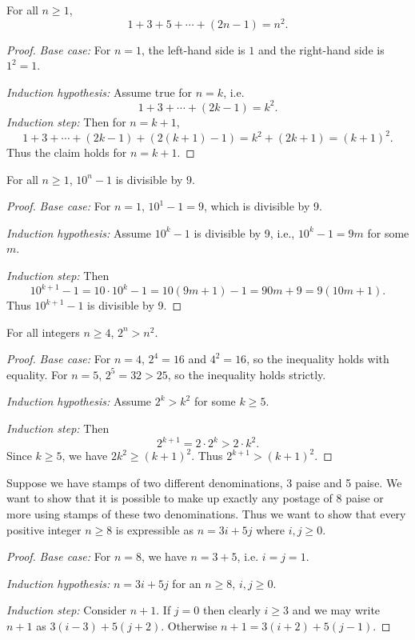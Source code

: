 \begin{theorem}
For all $n \geq 1$,
\[
1+3+5+\cdots+(2n-1) = n^2.
\]
\end{theorem}
\begin{proof}

\noindent
\emph{Base case:} For $n=1$, the left-hand side is $1$ and the right-hand side 
is $1^2=1$.

\noindent
\emph{Induction hypothesis:} Assume true for $n=k$, i.e.
\[
1+3+\cdots+(2k-1) = k^2.
\]
\emph{Induction step:} Then for $n=k+1$,
\[
1+3+\cdots+(2k-1) + (2(k+1)-1) = k^2 + (2k+1) = (k+1)^2.
\]
Thus the claim holds for $n=k+1$.
\end{proof}

\begin{theorem}
For all $n \geq 1$, $10^n - 1$ is divisible by $9$.
\end{theorem}
\begin{proof}

\noindent
\emph{Base case:} For $n=1$, $10^1 - 1 = 9$, which is divisible by 9.

\noindent
\emph{Induction hypothesis:} Assume $10^k - 1$ is divisible by 9, i.e.,
$10^k - 1 = 9m$ for some $m$. 

\noindent
\emph{Induction step:} Then
\[
10^{k+1} - 1 = 10 \cdot 10^k - 1 = 10(9m+1) - 1 = 90m+9 = 9(10m+1).
\]
Thus $10^{k+1} - 1$ is divisible by 9.
\end{proof}

\begin{theorem}
For all integers $n \geq 4$, $2^n > n^2$.
\end{theorem}
\begin{proof}

\noindent
\emph{Base case:} For $n=4$, $2^4=16$ and $4^2=16$, so the inequality holds 
with equality. For $n=5$, $2^5=32 > 25$, so the inequality holds strictly. 

\noindent
\emph{Induction hypothesis:} Assume $2^k > k^2$ for some $k \geq 5$. 

\noindent
\emph{Induction step:} Then
\[
2^{k+1} = 2 \cdot 2^k > 2 \cdot k^2.
\]
  Since $k \geq 5$, we have $2k^2 \geq (k+1)^2$. Thus $2^{k+1} > (k+1)^2$.
\end{proof}

\begin{theorem}
Suppose we have stamps of two different denominations, 3 paise and 5 paise.
We want to show that it is possible to make up exactly any postage of 8 paise
or more using stamps of these two denominations. Thus we want to
show that every positive integer $n \geq 8$ is expressible  as  
$n = 3i + 5j$  where $i,j \geq 0$.
\end{theorem}
\begin{proof}

\noindent
\emph{Base case:} For $n = 8$, we have $n = 3 + 5$, i.e. $i = j = 1$.

\noindent
\emph{Induction hypothesis:} $n = 3i + 5j$ for an $n \geq 8$, $i, j \geq 0$.

\noindent
\emph{Induction step:} Consider $n+1$. If $j = 0$ then clearly $i \geq  3$ 
and  we  may  write $n+1$ as $3(i - 3) + 5(j + 2)$. Otherwise 
$n+1 = 3(i + 2) + 5(j - 1)$.
\end{proof}

